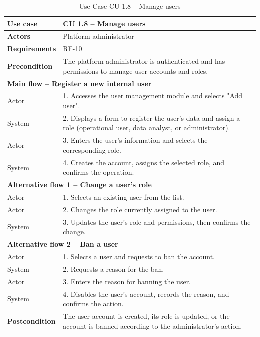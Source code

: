 \documentclass{article}
\begin{document}
\begin{table}[H]
\centering
\small
\renewcommand{\arraystretch}{1.35}
\caption{Use Case CU 1.8 -- Manage users}
\label{tab:cu1.8}
\begin{tabularx}{\textwidth}{|l|X|}
\hline
\textbf{Use case} & CU 1.8 -- Manage users \\ \hline
\textbf{Actors} & Platform administrator \\ \hline
\textbf{Requirements} & RF-10 \\ \hline
\textbf{Precondition} & The platform administrator is authenticated and has permissions to manage user accounts and roles. \\ \hline
\multicolumn{2}{|l|}{\textbf{Main flow -- Register a new internal user}} \\ \hline
Actor & 1. Accesses the user management module and selects "Add user". \\ \hline
System & 2. Displays a form to register the user's data and assign a role (operational user, data analyst, or administrator). \\ \hline
Actor & 3. Enters the user's information and selects the corresponding role. \\ \hline
System & 4. Creates the account, assigns the selected role, and confirms the operation. \\ \hline
\multicolumn{2}{|l|}{\textbf{Alternative flow 1 -- Change a user's role}} \\ \hline
Actor & 1. Selects an existing user from the list. \\ \hline
Actor & 2. Changes the role currently assigned to the user. \\ \hline
System & 3. Updates the user's role and permissions, then confirms the change. \\ \hline
\multicolumn{2}{|l|}{\textbf{Alternative flow 2 -- Ban a user}} \\ \hline
Actor & 1. Selects a user and requests to ban the account. \\ \hline
System & 2. Requests a reason for the ban. \\ \hline
Actor & 3. Enters the reason for banning the user. \\ \hline
System & 4. Disables the user's account, records the reason, and confirms the action. \\ \hline
\textbf{Postcondition} & The user account is created, its role is updated, or the account is banned according to the administrator's action. \\ \hline
\end{tabularx}
\end{table}
\end{document}
